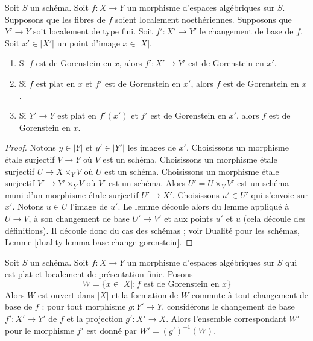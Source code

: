 \begin{lemma}
\label{lemma-base-change-gorenstein}
Soit $S$ un schéma.
Soit $f : X \to Y$ un morphisme d'espaces algébriques sur $S$.
Supposons que les fibres de $f$ soient localement noethériennes.
Supposons que $Y' \to Y$ soit localement de type fini. Soit $f' : X' \to Y'$
le changement de base de $f$.
Soit $x' \in |X'|$ un point d'image $x \in |X|$.
\begin{enumerate}
\item Si $f$ est de Gorenstein en $x$, alors
$f' : X' \to Y'$ est de Gorenstein en $x'$.
\item Si $f$ est plat en $x$ et $f'$ est de Gorenstein en $x'$, alors $f$
est de Gorenstein en $x$.
\item Si $Y' \to Y$ est plat en $f'(x')$ et $f'$ est de Gorenstein en
$x'$, alors $f$ est de Gorenstein en $x$.
\end{enumerate}
\end{lemma}

\begin{proof}
Notons $y \in |Y|$ et $y' \in |Y'|$ les images de $x'$.
Choisissons un morphisme étale surjectif $V \to Y$ où $V$ est un schéma.
Choisissons un morphisme étale surjectif $U \to X \times_Y V$ où
$U$ est un schéma.
Choisissons un morphisme étale surjectif $V' \to Y' \times_Y V$
où $V'$ est un schéma.
Alors $U' = U \times_V V'$ est un schéma muni
d'un morphisme étale surjectif $U' \to X'$.
Choisissons $u' \in U'$ qui s'envoie sur $x'$. Notons $u \in U$ l'image de $u'$.
Le lemme découle alors du lemme appliqué à
$U \to V$, à son changement de base $U' \to V'$ et aux
points $u'$ et $u$ (cela découle des définitions).
Il découle donc du cas des schémas ; voir
Dualité pour les schémas, Lemme \ref{duality-lemma-base-change-gorenstein}.
\end{proof}

\begin{lemma}
\label{lemma-flat-finite-presentation-gorenstein-open}
Soit $S$ un schéma.
Soit $f : X \to Y$ un morphisme d'espaces algébriques sur $S$
qui est plat et localement de présentation finie. Posons
$$
W = \{x \in |X| : f\text{ est de Gorenstein en }x\}
$$
Alors $W$ est ouvert dans $|X|$ et la formation de $W$
commute à tout changement de base de $f$ :
pour tout morphisme $g : Y' \to Y$, considérons
le changement de base $f' : X' \to Y'$ de $f$ et la
projection $g' : X' \to X$. Alors l'ensemble correspondant
$W'$ pour le morphisme $f'$ est donné par $W' = (g')^{-1}(W)$.
\end{lemma}

